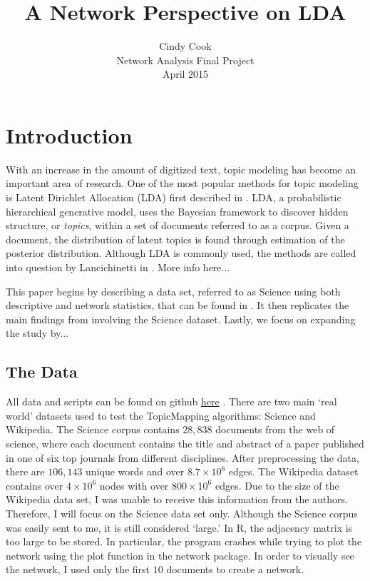 \documentclass[12pt,times]{elsarticle}
\begin{document}
	\title{A Network Perspective on LDA}
	\author{Cindy Cook \\ \normalsize Network Analysis Final Project \\ \normalsize April 2015}
	\date{}
	\maketitle

\section{Introduction}
\vspace{-4mm}
With an increase in the amount of digitized text, topic modeling has become an important area of research. One of the most popular methods for topic modeling is Latent Dirichlet Allocation (LDA) first described in \cite{lda}. LDA, a probabilistic hierarchical generative model, uses the Bayesian framework to discover hidden structure, or \textit{topics},  within a set of documents referred to as a corpus. Given a document, the distribution of latent topics is found through estimation of the posterior distribution. Although LDA is commonly used, the methods are called into question by Lancichinetti in \cite{main}. More info here...
\par
This paper begins by describing a data set, referred to as Science using both descriptive and network statistics, that can be found in \cite{main}. It then replicates the main findings from \cite{main} involving the Science dataset. Lastly, we focus on expanding the study by...

\subsection{The Data}
\vspace{-4mm}
All data and scripts can be found on github \href{https://github.com/cmcook22/Cook_Networks_Project}{here} . There are two main `real world' datasets used to test the TopicMapping algorithms:  Science and Wikipedia. The Science corpus contains $28,838$ documents from the web of science, where each document contains the title and abstract of a paper published in one of six top journals from different disciplines. After preprocessing the data, there are $106,143$ unique words and over $8.7 \times 10^{6}$ edges. The Wikipedia dataset contains over $4 \times 10^{6}$ nodes with over $800 \times 10^{6}$ edges. Due to the size of the Wikipedia data set, I was unable to receive this information from the authors. Therefore, I will focus on the Science data set only. Although the Science corpus was easily sent to me, it is still considered `large.' In R, the adjacency matrix is too large to be stored. In particular, the program crashes while trying to plot the network using the plot function in the network package. In order to visually see the network, I used only the first $10$ documents to create a network.
\end{document}
